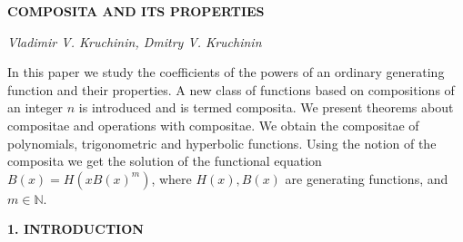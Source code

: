 \documentclass[12pt]{article}
\begin{document}
\theoremstyle{plain}
\newtheorem{theorem}{Theorem}
\newtheorem{definition}[theorem]{Definition}
\newtheorem{corollary}[theorem]{Corollary}
\newtheorem{lemma}[theorem]{Lemma}


\theoremstyle{definition}
\newtheorem{example}[theorem]{Example}
\newtheorem{remark}[theorem]{Remark}
\makeatletter
\def\rdots{\mathinner{\mkern1mu\raise\p@
\vbox{\kern7\p@\hbox{.}}\mkern2mu
\raise4\p@\hbox{.}\mkern2mu\raise7\p@\hbox{.}\mkern1mu}}
\makeatother
\renewcommand{\arraystretch}{1.8}

\oddsidemargin 16.5mm
\evensidemargin 16.5mm

\thispagestyle{plain}

\vspace{5cc}
\begin{center}

{\large\bf  COMPOSITA AND ITS PROPERTIES
\rule{0mm}{6mm}\renewcommand{\thefootnote}{}%
}

\vspace{1cc}
{\large\it Vladimir V. Kruchinin, Dmitry V. Kruchinin }

\vspace{1cc}
\parbox{24cc}{{\small

In this paper we study the coefficients of the powers of an ordinary generating function and their properties.
A new class of functions based on compositions of an integer $n$ is introduced and is termed composita.
We present theorems about compositae  and operations with compositae. We obtain the compositae of polynomials,  trigonometric and hyperbolic functions. Using the notion of the composita we get the solution of the functional equation $B(x)=H(xB(x)^m)$, where $H(x),B(x)$ are generating functions, and $m\in \mathbb{N}$.

}}
\end{center}

\vspace{1cc}


\vspace{1.5cc}
\begin{center}
{\bf 1. INTRODUCTION}
\end{center}
\end{document}
